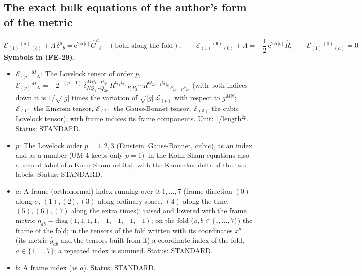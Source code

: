 \documentclass[
  10pt,
]{article}
\providecommand{\tightlist}{%
  \setlength{\itemsep}{0pt}\setlength{\parskip}{0pt}}
\begin{document}
\hypertarget{the-exact-bulk-equations-of-the-authors-form-of-the-metric}{%
\subsection{The exact bulk equations of the author's form of the
metric}\label{the-exact-bulk-equations-of-the-authors-form-of-the-metric}}

\[
\mathcal{E}_{(1)}{}^{(a)}{}_{(b)} + \Lambda\,\delta^a{}_b = \mathrm{e}^{2H\lvert\sigma\rvert}\,\hat G^a{}_b\quad(\text{both along the fold}),\qquad
\mathcal{E}_{(1)}{}^{(0)}{}_{(0)} + \Lambda = -\frac12\,\mathrm{e}^{2H\lvert\sigma\rvert}\,\hat R,\qquad
\mathcal{E}_{(1)}{}^{(0)}{}_{(a)} = 0 \tag{FE-29}
\] \textbf{Symbols in (FE-29).}

\begin{itemize}
\tightlist
\item
  \(\mathcal{E}_{(p)}{}^M{}_N\): The Lovelock tensor of order \(p\),
  \(\mathcal{E}_{(p)}{}^M{}_N = -2^{-(p+1)}\,\delta^{MP_1\cdots P_{2p}}_{NQ_1\cdots Q_{2p}}\,R^{Q_1Q_2}{}_{P_1P_2}\cdots R^{Q_{2p-1}Q_{2p}}{}_{P_{2p-1}P_{2p}}\)
  (with both indices down it is \(1/\sqrt{\lvert g\rvert}\) times the
  variation of \(\sqrt{\lvert g\rvert}\,\mathcal{L}_{(p)}\) with respect
  to \(g^{MN}\); \(\mathcal{E}_{(1)}\) the Einstein tensor,
  \(\mathcal{E}_{(2)}\) the Gauss-Bonnet tensor, \(\mathcal{E}_{(3)}\)
  the cubic Lovelock tensor); with frame indices its frame components.
  Unit: 1/length\(^{2p}\). Status: STANDARD.
\item
  \(p\): The Lovelock order \(p = 1, 2, 3\) (Einstein, Gauss-Bonnet,
  cubic), as an index and as a number (UM-4 keeps only \(p = 1\)); in
  the Kohn-Sham equations also a second label of a Kohn-Sham orbital,
  with the Kronecker delta of the two labels. Status: STANDARD.
\item
  \(a\): A frame (orthonormal) index running over \(0, 1, \dots, 7\)
  (frame direction \((0)\) along \(\sigma\), \((1), (2), (3)\) along
  ordinary space, \((4)\) along the time, \((5), (6), (7)\) along the
  extra times); raised and lowered with the frame metric
  \(\eta_{ab} = \mathrm{diag}(1, 1, 1, 1, -1, -1, -1, -1)\); on the fold
  (\(a, b \in \{1, \dots, 7\}\)) the frame of the fold; in the tensors
  of the fold written with its coordinates \(x^a\) (its metric
  \(\hat g_{ab}\) and the tensors built from it) a coordinate index of
  the fold, \(a \in \{1, \dots, 7\}\); a repeated index is summed.
  Status: STANDARD.
\item
  \(b\): A frame index (as \(a\)). Status: STANDARD.

\end{itemize}
\end{document}
